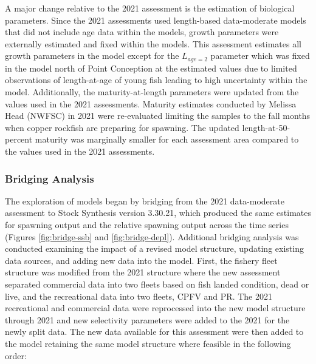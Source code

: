 \documentclass[11pt,
  english,
  letterpaper,
]{article}
\begin{document}
A major change relative to the 2021 assessment is the estimation of biological parameters. Since the 2021 assessments used length-based data-moderate models that did not include age data within the models, growth parameters were externally estimated and fixed within the models. This assessment estimates all growth parameters in the model except for the \(L_{age=2}\) parameter which was fixed in the model north of Point Conception at the estimated values due to limited observations of length-at-age of young fish leading to high uncertainty within the model. Additionally, the maturity-at-length parameters were updated from the values used in the 2021 assessments. Maturity estimates conducted by Melissa Head (NWFSC) in 2021 were re-evaluated limiting the samples to the fall months when copper rockfish are preparing for spawning. The updated length-at-50-percent maturity was marginally smaller for each assessment area compared to the values used in the 2021 assessments.

\hypertarget{bridging-analysis}{%
\subsubsection{Bridging Analysis}\label{bridging-analysis}}

The exploration of models began by bridging from the 2021 data-moderate assessment to Stock Synthesis version 3.30.21, which produced the same estimates for spawning output and the relative spawning output across the time series (Figures \ref{fig:bridge-ssb} and \ref{fig:bridge-depl}). Additional bridging analysis was conducted examining the impact of a revised model structure, updating existing data sources, and adding new data into the model. First, the fishery fleet structure was modified from the 2021 structure where the new assessment separated commercial data into two fleets based on fish landed condition, dead or live, and the recreational data into two fleets, CPFV and PR. The 2021 recreational and commercial data were reprocessed into the new model structure through 2021 and new selectivity parameters were added to the 2021 for the newly split data. The new data available for this assessment were then added to the model retaining the same model structure where feasible in the following order:
\end{document}
